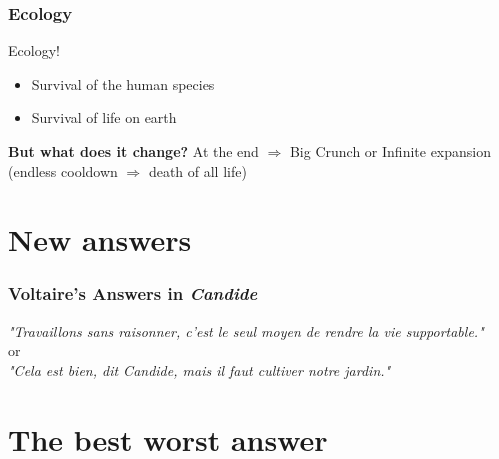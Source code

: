 \documentclass{beamer}
\begin{document}
    \begin{frame}
    	\frametitle{Ecology}
    		
    	Ecology! \pause
    	\begin{itemize}[<+->]
    		\item Survival of the human species 
    		\item Survival of life on earth
    	\end{itemize}
    		
	\pause
    	\textbf{But what does it change?} At the end $\Rightarrow$ Big Crunch or Infinite expansion (endless cooldown $\Rightarrow$ death of all life)
    		
    		
    \end{frame}
    
    \section{New answers} %
    \begin{frame}
    	\frametitle{Voltaire's Answers in \textit{Candide}}
    	
    	\begin{center}
    	\textit{"Travaillons sans raisonner, c'est le seul moyen de rendre la vie supportable."} \\ \pause
    	or \\ \pause
    	\textit{"Cela est bien, dit Candide, mais il faut cultiver notre jardin."}
    	\end{center}	
    \end{frame}
    
    \section{The best worst answer}
    
\end{document}
